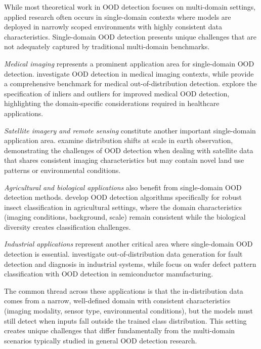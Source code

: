 \documentclass[11pt, oneside]{book}
\theoremstyle{plain}
\theoremstyle{definition}
\theoremstyle{remark}
\begin{document}
While most theoretical work in OOD detection focuses on multi-domain settings, applied research often occurs in single-domain contexts where models are deployed in narrowly scoped environments with highly consistent data characteristics. Single-domain OOD detection presents unique challenges that are not adequately captured by traditional multi-domain benchmarks.

\emph{Medical imaging} represents a prominent application area for single-domain OOD detection. \citet{zhang2021out} investigate OOD detection in medical imaging contexts, while \citet{cao2020benchmark} provide a comprehensive benchmark for medical out-of-distribution detection. \citet{narayanaswamy2023exploring} explore the specification of inliers and outliers for improved medical OOD detection, highlighting the domain-specific considerations required in healthcare applications.

\emph{Satellite imagery and remote sensing} constitute another important single-domain application area. \citet{ekim2024distribution} examine distribution shifts at scale in earth observation, demonstrating the challenges of OOD detection when dealing with satellite data that shares consistent imaging characteristics but may contain novel land use patterns or environmental conditions.

\emph{Agricultural and biological applications} also benefit from single-domain OOD detection methods. \citet{saadati2024out} develop OOD detection algorithms specifically for robust insect classification in agricultural settings, where the domain characteristics (imaging conditions, background, scale) remain consistent while the biological diversity creates classification challenges.

\emph{Industrial applications} represent another critical area where single-domain OOD detection is essential. \citet{kafunah2023out} investigate out-of-distribution data generation for fault detection and diagnosis in industrial systems, while \citet{kim2021wafer} focus on wafer defect pattern classification with OOD detection in semiconductor manufacturing.

The common thread across these applications is that the in-distribution data comes from a narrow, well-defined domain with consistent characteristics (imaging modality, sensor type, environmental conditions), but the models must still detect when inputs fall outside the trained class distribution. This setting creates unique challenges that differ fundamentally from the multi-domain scenarios typically studied in general OOD detection research.
\end{document}
